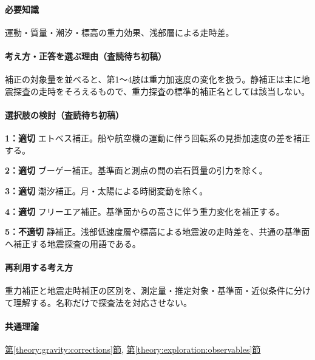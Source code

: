 \paragraph{必要知識} 運動・質量・潮汐・標高の重力効果、浅部層による走時差。

\paragraph{考え方・正答を選ぶ理由（査読待ち初稿）} 補正の対象量を並べると、第1〜4肢は重力加速度の変化を扱う。静補正は主に地震探査の走時をそろえるもので、重力探査の標準的補正名としては該当しない。

\paragraph{選択肢の検討（査読待ち初稿）}\mbox{}\par

\noindent\textbf{1：適切} エトベス補正。船や航空機の運動に伴う回転系の見掛加速度の差を補正する。\par

\noindent\textbf{2：適切} ブーゲー補正。基準面と測点の間の岩石質量の引力を除く。\par

\noindent\textbf{3：適切} 潮汐補正。月・太陽による時間変動を除く。\par

\noindent\textbf{4：適切} フリーエア補正。基準面からの高さに伴う重力変化を補正する。\par

\noindent\textbf{5：不適切} 静補正。浅部低速度層や標高による地震波の走時差を、共通の基準面へ補正する地震探査の用語である。\par

\paragraph{再利用する考え方} 重力補正と地震走時補正の区別を、測定量・推定対象・基準面・近似条件に分けて理解する。名称だけで探査法を対応させない。

\paragraph{共通理論} \hyperref[theory:gravity:corrections]{第\ref*{theory:gravity:corrections}節}, \hyperref[theory:exploration:observables]{第\ref*{theory:exploration:observables}節}

